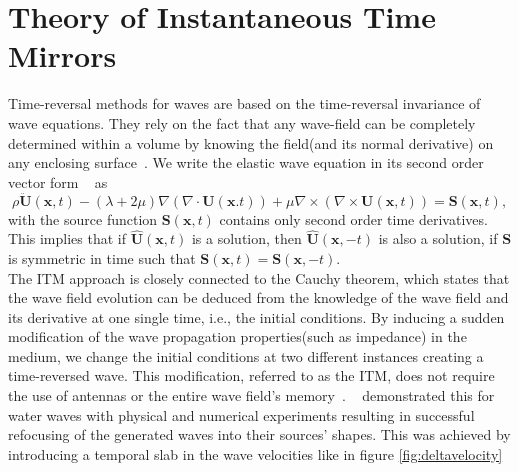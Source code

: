 \section{Theory of Instantaneous Time Mirrors}\label{section:ITMTheory}
Time-reversal methods for waves are based on the time-reversal invariance of wave equations. They rely on the fact that any wave-field can be completely determined within
a volume by knowing the field(and its normal derivative) on any enclosing surface~\parencite{Bacot2016}. We write the elastic wave equation in its second order vector form
~\parencite[Cha. 2]{aki2002quantitative} as
\begin{equation}
    \rho \ddot{\mathbf{U}} \left( \mathbf{x}, t\right) - \left( \lambda + 2 \mu \right) \nabla \left(\nabla \cdot \mathbf{U}\left(\mathbf{x}. t\right)\right) 
    + \mu \nabla \times \left(\nabla \times \mathbf{U}\left(\mathbf{x},t\right)\right) = \mathbf{S}\left(\mathbf{x},t\right),
\end{equation}
with the source function $\mathbf{S}\left(\mathbf{x},t\right)$ contains only second order time derivatives. This implies that if $\hat{\mathbf{U}}\left(\mathbf{x},t\right)$
is a solution, then $\hat{\mathbf{U}}\left(\mathbf{x}, -t\right)$ is also a solution, if $\mathbf{S}$ is symmetric in time such that 
$\mathbf{S}\left(\mathbf{x}, t\right) = \mathbf{S}\left(\mathbf{x}, -t\right)$. \\

The \ac{ITM} approach is closely connected to the Cauchy theorem, which states that the wave field evolution can be deduced from the knowledge of the wave field
and its derivative at one single time, i.e., the initial conditions. By inducing a sudden modification of the wave propagation properties(such as impedance) in the
medium, we change the initial conditions at two different instances creating a time-reversed wave. This modification, referred to as the \ac{ITM}, does not require the use of antennas or the entire wave field's memory~\parencite{Bacot2016}.
~\parencite{Bacot2016} demonstrated this for water waves with physical and numerical experiments resulting in successful refocusing of the generated waves into their
sources' shapes. This was achieved by introducing a temporal slab in the wave velocities like in figure \ref{fig:deltavelocity}

